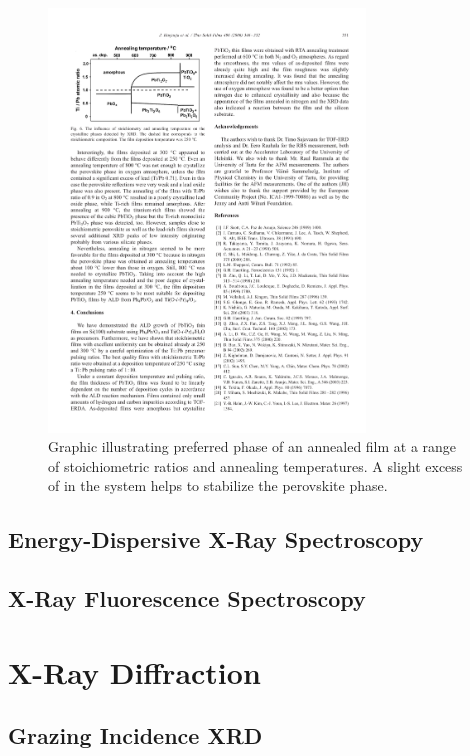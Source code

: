 \begin{figure}[htbp]
   \centering
   \includegraphics[width=0.75\textwidth]{./figures/dataanalysis/PTO-phase}
   \caption[Preferred Phase vs. Stoichiometric Ratio]{Graphic illustrating preferred phase of an annealed %
   		film at a range of stoichiometric ratios and annealing temperatures. A slight excess of  %
		in the system helps to stabilize the perovskite \PTO{} phase.\cite{harjuoja_2006}}
   \label{fig:PTO-phase}
\end{figure}

\lipsum


\subsection{Energy-Dispersive X-Ray Spectroscopy}



\lipsum


\subsection{X-Ray Fluorescence Spectroscopy}

\lipsum


\section{X-Ray Diffraction}

\lipsum


\subsection{Grazing Incidence XRD}

\lipsum






